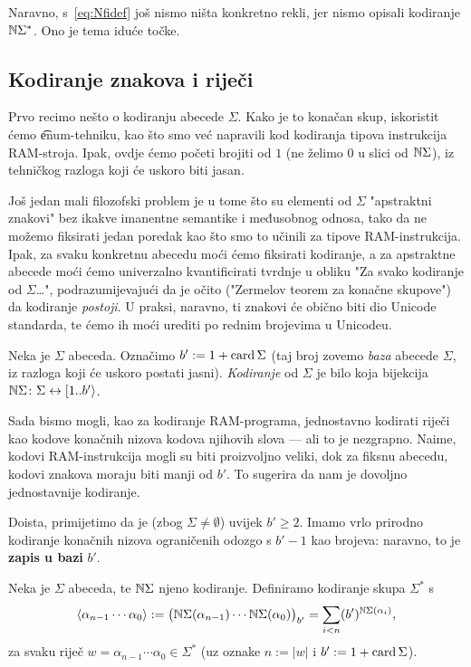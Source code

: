 Naravno, s~\eqref{eq:Nfidef} još nismo ništa konkretno rekli, jer nismo opisali kodiranje ${\mathbb N}\Sigma^*$. Ono je tema iduće točke.

\subsection{Kodiranje znakova i riječi}

Prvo recimo nešto o kodiranju abecede $\Sigma$. Kako je to konačan skup, iskoristit ćemo \t{enum}-tehniku, kao što smo već napravili kod kodiranja tipova instrukcija RAM-stroja. Ipak, ovdje ćemo početi brojiti od $1$ (ne želimo $0$ u slici od ${\mathbb N}\Sigma$), iz tehničkog razloga koji će uskoro biti jasan.

Još jedan mali filozofski problem je u tome što su elementi od $\Sigma$ "apstraktni znakovi" bez ikakve imanentne semantike i međusobnog odnosa, tako da ne možemo fiksirati jedan poredak kao što smo to učinili za tipove RAM-instrukcija. Ipak, za svaku konkretnu abecedu moći ćemo fiksirati kodiranje, a za apstraktne abecede moći ćemo univerzalno kvantificirati tvrdnje u obliku "Za svako kodiranje od $\Sigma$\ldots", podrazumijevajući da je očito ("Zermelov teorem za konačne skupove") da kodiranje \emph{postoji}. U praksi, naravno, ti znakovi će obično biti dio Unicode standarda, te ćemo ih moći urediti po rednim brojevima u Unicodeu.

\begin{definicija}
Neka je $\Sigma$ abeceda. Označimo $b':=1+\operatorname{card}\Sigma$ (taj broj zovemo \emph{baza} abecede $\Sigma$, iz razloga koji će uskoro postati jasni). \emph{Kodiranje} od $\Sigma$ je bilo koja bijekcija ${\mathbb N}\Sigma\colon\Sigma\leftrightarrow[1..b'\rangle$.
\end{definicija}

Sada bismo mogli, kao za kodiranje RAM-programa, jednostavno kodirati riječi kao kodove konačnih nizova kodova njihovih slova --- ali to je nezgrapno. Naime, kodovi RAM-instrukcija mogli su biti proizvoljno veliki, dok za fiksnu abecedu, kodovi znakova moraju biti manji od $b'$. To sugerira da nam je dovoljno jednostavnije kodiranje.

Doista, primijetimo da je (zbog $\Sigma\not=\emptyset$) uvijek $b'\ge2$. Imamo vrlo prirodno kodiranje konačnih nizova ograničenih odozgo s $b'-1$ kao brojeva: naravno, to je \textbf{zapis u bazi} $b'$.

\begin{definicija}
Neka je $\Sigma$ abeceda, te ${\mathbb N}\Sigma$ njeno kodiranje. Definiramo kodiranje skupa $\Sigma^*$ s
\begin{equation}
    \langle\alpha_{n-1}\dotsm\alpha_0\rangle:=\bigl({\mathbb N}\Sigma(\alpha_{n-1})\dotsm{\mathbb N}\Sigma(\alpha_0)\bigr)_{b'}=\sum_{i<n}(b')^{{\mathbb N}\Sigma(\alpha_i)}\text,
\end{equation}
za svaku riječ $w=\alpha_{n-1}\dotsm\alpha_0\in\Sigma^*$ (uz oznake $n:=\left|w\right|$ i $b':=1+\operatorname{card}\Sigma$).
\end{definicija}

